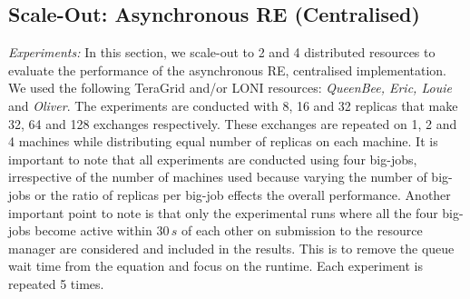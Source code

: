 \documentclass{rspublic}
\newcommand{\alnote}[1]{ {\textcolor{blue} { ***andre: #1 }}}
\newcommand{\alnote}[1]{}
\begin{document}

\subsection{Scale-Out: Asynchronous RE (Centralised)}
{\it Experiments:} In this section, we scale-out to 2 and 4
distributed resources to evaluate the performance of the asynchronous
RE, centralised implementation.  We used the following TeraGrid and/or
LONI resources: \emph{QueenBee, Eric, Louie} and \emph{Oliver}. The
experiments are conducted with 8, 16 and 32 replicas that make 32, 64
and 128 exchanges respectively. These exchanges are repeated on 1, 2
and 4 machines while distributing equal number of replicas on each
machine. It is important to note that all experiments are conducted
using four big-jobs, irrespective of the number of machines used
because varying the number of big-jobs or the ratio of replicas per
big-job effects the overall performance.  Another important point to
note is that only the experimental runs where all the four
big-jobs %
become active within $30\,s$ of each other on submission to the
resource manager are considered and included in the results. This is
to remove the queue wait time from the equation and focus on the
runtime. Each experiment is repeated 5 times.

%
\end{document}
